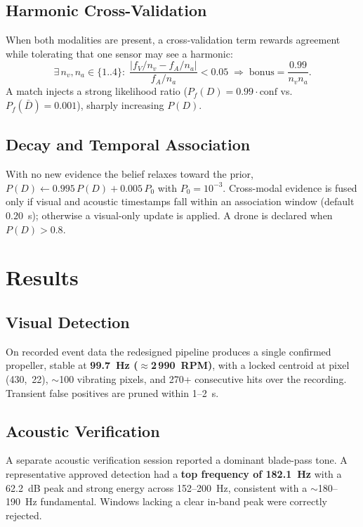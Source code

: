 \documentclass[conference]{IEEEtran}
\begin{document}
\subsection{Harmonic Cross-Validation}
When both modalities are present, a cross-validation term rewards agreement
while tolerating that one sensor may see a harmonic:
\begin{equation}
\exists\, n_v,n_a\in\{1..4\}:\;
\frac{\bigl|f_V/n_v - f_A/n_a\bigr|}{f_A/n_a} < 0.05
\;\Rightarrow\; \text{bonus} = \frac{0.99}{n_v n_a}.
\end{equation}
A match injects a strong likelihood ratio ($P_f(D)=0.99\cdot\text{conf}$ vs.
$P_f(\bar D)=0.001$), sharply increasing $P(D)$.

\subsection{Decay and Temporal Association}
With no new evidence the belief relaxes toward the prior,
$P(D)\leftarrow 0.995\,P(D)+0.005\,P_0$ with $P_0=10^{-3}$. Cross-modal
evidence is fused only if visual and acoustic timestamps fall within an
association window (default $0.20$~s); otherwise a visual-only update is
applied. A drone is declared when $P(D) > 0.8$.

\section{Results}
\label{sec:results}

\subsection{Visual Detection}
On recorded event data the redesigned pipeline produces a single confirmed
propeller, stable at \textbf{99.7~Hz ($\approx$2\,990~RPM)}, with a locked
centroid at pixel (430,~22), $\sim$100 vibrating pixels, and 270+ consecutive
hits over the recording. Transient false positives are pruned within 1--2~s.

\subsection{Acoustic Verification}
A separate acoustic verification session reported a dominant blade-pass tone.
A representative approved detection had a \textbf{top frequency of 182.1~Hz}
with a 62.2~dB peak and strong energy across 152--200~Hz, consistent with a
$\sim$180--190~Hz fundamental. Windows lacking a clear in-band peak were
correctly rejected.
\end{document}
